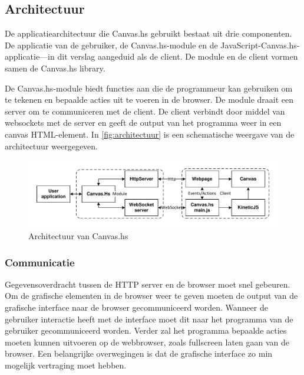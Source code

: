 \subsection{Architectuur}
\label{subsec:architectuur}

De applicatiearchitectuur die Canvas.hs gebruikt bestaat uit drie componenten. De applicatie van de gebruiker, de Canvas.hs-module en de JavaScript-Canvas.hs-applicatie—in dit verslag aangeduid als de client. De module en de client vormen samen de Canvas.hs library.

De Canvas.hs-module biedt functies aan die de programmeur kan gebruiken om te tekenen en bepaalde acties uit te voeren in de browser. De module draait een server om te communiceren met de client. De client verbindt door middel van websockets met de server en geeft de output van het programma weer in een canvas HTML-element. In \autoref{fig:architectuur} is een schematische weergave van de architectuur weergegeven.

\begin{figure}
\begin{center}
\includegraphics[keepaspectratio,width=\textwidth]{./images/architecture.pdf}
\caption{Architectuur van Canvas.hs}
\label{fig:architectuur}
\end{center}
\end{figure}

\subsubsection{Communicatie}
Gegevensoverdracht tussen de HTTP server en de browser moet snel gebeuren. Om de grafische elementen in de browser weer te geven moeten de output van de grafische interface naar de browser gecommuniceerd worden. Wanneer de gebruiker interactie heeft met de interface moet dit naar het programma van de gebruiker gecommuniceerd worden. Verder zal het programma bepaalde acties moeten kunnen uitvoeren op de webbrowser, zoals fullscreen laten gaan van de browser. Een belangrijke overwegingen is dat de grafische interface zo min mogelijk vertraging moet hebben.


